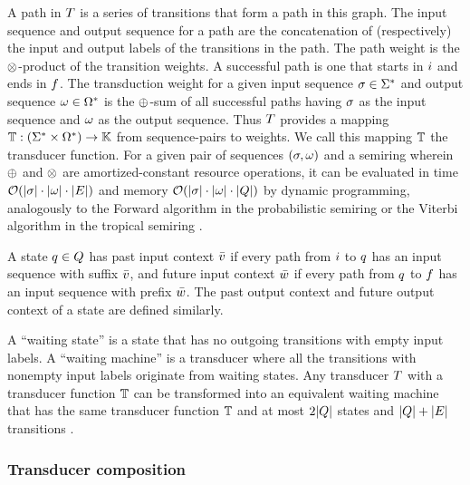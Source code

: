 \documentclass[english]{article}
\begin{document}
A path in $T$ is a series of transitions that form a path in this graph.
The input sequence and output sequence for a path are the concatenation of (respectively)
the input and output labels of the transitions in the path.
The path weight is the $\otimes$-product of the transition weights.
A successful path is one that starts in $i$ and ends in $f$.
The transduction weight for a given input sequence $\sigma \in {\Sigma}^{\ast}$
and output sequence $\omega \in {\Omega}^{\ast}$
is the $\oplus$-sum of all successful paths
having $\sigma$ as the input sequence
and $\omega$ as the output sequence.
Thus $T$ provides a mapping
$\mathbb{T}:({\Sigma}^{\ast} \times {\Omega}^{\ast}) \to \mathbb{K}$
from sequence-pairs to weights.
We call this mapping $\mathbb{T}$ the transducer function.
For a given pair of sequences $(\sigma,\omega)$
and a semiring wherein $\oplus$ and $\otimes$ are amortized-constant resource operations,
it can be evaluated in time ${\cal O}(|\sigma| \cdot |\omega| \cdot |E|)$
and memory ${\cal O}(|\sigma| \cdot |\omega| \cdot |Q|)$
by dynamic programming,
analogously to the Forward algorithm in the probabilistic semiring
or the Viterbi algorithm in the tropical semiring
\cite{Durbin98}.

A state $q \in Q$ has past input context $\bar{v}$ if every path from $i$ to $q$ has an input sequence with suffix $\bar{v}$,
and future input context $\bar{w}$ if every path from $q$ to $f$ has an input sequence with prefix $\bar{w}$.
The past output context and future output context of a state are defined similarly.

A ``waiting state'' is a state that has no outgoing transitions with empty input labels.
A ``waiting machine'' is a transducer where all the transitions with nonempty input labels
originate from waiting states.
Any transducer $T$ with a transducer function $\mathbb{T}$
can be transformed into an equivalent waiting machine
that has the same transducer function $\mathbb{T}$ and
at most $2|Q|$ states and $|Q|+|E|$ transitions
\cite{WestessonEtAlArxiv2012}.

\subsubsection{Transducer composition}
\end{document}
